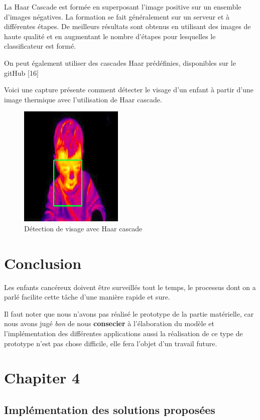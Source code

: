\documentclass[12pt]{article}
\begin{document}
La Haar Cascade est formée en superposant l'image positive sur un ensemble d'images négatives. La formation se fait généralement sur un serveur et à différentes étapes. De meilleurs résultats sont obtenus en utilisant des images de haute qualité et en augmentant le nombre d'étapes pour lesquelles le classificateur est formé.

On peut également utiliser des cascades Haar prédéfinies, disponibles sur le gitHub [16]

Voici une capture présente comment détecter le visage d'un enfant à partir d'une image thermique avec l'utilisation de Haar cascade.

\begin{figure}[h]
	\centering
	\includegraphics[scale=1]{img-Chapiter-3/enfant.png}
	\caption{Détection de visage avec Haar cascade}
\end{figure}
\section{Conclusion}
Les enfants cancéreux doivent être surveillés tout le temps, le processus dont on a parlé facilite cette tâche d’une manière rapide et sure. 

Il faut noter que nous n'avons pas réalisé le prototype de la partie matérielle, car nous avons jugé \textit{bon} de nous \textbf{consecier} à l'élaboration du modèle et l'implémentation des différentes applications aussi la réalisation de ce type de prototype n'est pas chose difficile, elle fera l'objet d'un travail future.

\newpage
\rhead{}
\section*{\Huge{Chapiter 4}}
\subsection*{\huge{Implémentation des solutions proposées}}
\newpage
{}
\end{document}
